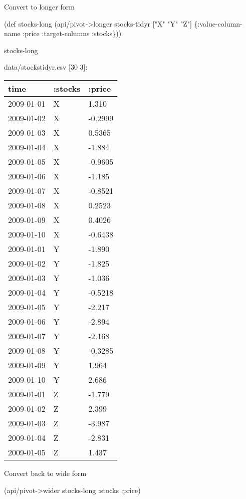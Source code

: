 \documentclass[]{article}
\newenvironment{Shaded}{\begin{snugshade}}{\end{snugshade}}
\newcommand{\StringTok}[1]{\textcolor[rgb]{0.31,0.60,0.02}{#1}}
\newcommand{\FunctionTok}[1]{\textcolor[rgb]{0.00,0.00,0.00}{#1}}
\newcommand{\BuiltInTok}[1]{#1}
\newcommand{\AttributeTok}[1]{\textcolor[rgb]{0.77,0.63,0.00}{#1}}
\newcommand{\NormalTok}[1]{#1}
\begin{document}
Convert to longer form

\begin{Shaded}
\begin{Highlighting}[]
\NormalTok{(}\BuiltInTok{def}\FunctionTok{ stocks-long }\NormalTok{(api/pivot->longer stocks-tidyr [}\StringTok{"X"} \StringTok{"Y"} \StringTok{"Z"}\NormalTok{] \{}\AttributeTok{:value-column-name} \AttributeTok{:price}
                                                                \AttributeTok{:target-columns} \AttributeTok{:stocks}\NormalTok{\}))}
\end{Highlighting}
\end{Shaded}

\begin{Shaded}
\begin{Highlighting}[]
\NormalTok{stocks-long}
\end{Highlighting}
\end{Shaded}

data/stockstidyr.csv {[}30 3{]}:

\begin{longtable}[]{@{}lll@{}}
\toprule
time & :stocks & :price\tabularnewline
\midrule
\endhead
2009-01-01 & X & 1.310\tabularnewline
2009-01-02 & X & -0.2999\tabularnewline
2009-01-03 & X & 0.5365\tabularnewline
2009-01-04 & X & -1.884\tabularnewline
2009-01-05 & X & -0.9605\tabularnewline
2009-01-06 & X & -1.185\tabularnewline
2009-01-07 & X & -0.8521\tabularnewline
2009-01-08 & X & 0.2523\tabularnewline
2009-01-09 & X & 0.4026\tabularnewline
2009-01-10 & X & -0.6438\tabularnewline
2009-01-01 & Y & -1.890\tabularnewline
2009-01-02 & Y & -1.825\tabularnewline
2009-01-03 & Y & -1.036\tabularnewline
2009-01-04 & Y & -0.5218\tabularnewline
2009-01-05 & Y & -2.217\tabularnewline
2009-01-06 & Y & -2.894\tabularnewline
2009-01-07 & Y & -2.168\tabularnewline
2009-01-08 & Y & -0.3285\tabularnewline
2009-01-09 & Y & 1.964\tabularnewline
2009-01-10 & Y & 2.686\tabularnewline
2009-01-01 & Z & -1.779\tabularnewline
2009-01-02 & Z & 2.399\tabularnewline
2009-01-03 & Z & -3.987\tabularnewline
2009-01-04 & Z & -2.831\tabularnewline
2009-01-05 & Z & 1.437\tabularnewline
\bottomrule
\end{longtable}

Convert back to wide form

\begin{Shaded}
\begin{Highlighting}[]
\NormalTok{(api/pivot->wider stocks-long }\AttributeTok{:stocks} \AttributeTok{:price}\NormalTok{)}
\end{Highlighting}
\end{Shaded}
\end{document}
